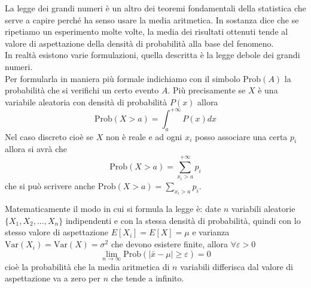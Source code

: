 \documentclass[openany,a4paper,12pt]{book}
\theoremstyle{remark}
\begin{document}
La legge dei grandi numeri è un altro dei teoremi fondamentali della statistica che serve a capire perché ha senso usare la media aritmetica. In sostanza dice che se ripetiamo un esperimento molte volte, la media dei risultati ottenuti tende al valore di aspettazione della densità di probabilità alla base del fenomeno. \\
In realtà esistono varie formulazioni, quella descritta è la legge debole dei grandi numeri. \\
Per formularla in maniera più formale indichiamo con il simbolo $\text{Prob}(A)$ la probabilità che si verifichi un certo evento $A$. Più precisamente se $X$ è una variabile aleatoria con densità di probabilità $P(x)$ allora 
\[
\text{Prob}(X > a) = \int_{a}^{+\infty} P(x) dx
\]
Nel caso discreto cioè se $X$ non è reale e ad ogni $x_i$ posso associare una certa $p_i$ allora si avrà che 
\[
\text{Prob}(X > a) = \sum_{x_i > a}^{+\infty} p_i
\]
che si può scrivere anche $\text{Prob}(X > a) = \sum_{x_i > a} p_i$.

Matematicamente il modo in cui si formula la legge è: date $n$ variabili aleatorie $\{X_1, X_2, \dots, X_n\}$ indipendenti e con la stessa densità di probabilità, quindi con lo stesso valore di aspettazione $E[X_i] = E[X] = \mu$ e varianza $\text{Var}(X_i) = \text{Var}(X) = \sigma^2$ che devono esistere finite, allora $\forall \varepsilon > 0$
\[
\lim_{n \to \infty} \text{Prob}(|\bar{x} - \mu| \ge \varepsilon) = 0
\]
cioè la probabilità che la media aritmetica di $n$ variabili differisca dal valore di aspettazione va a zero per $n$ che tende a infinito.
\end{document}
